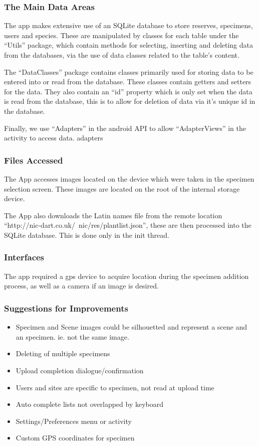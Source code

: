     \subsubsection{The Main Data Areas}
        The app makes extensive use of an SQLite database to store reserves, specimens, users and species. These are manipulated by classes for each table under the ``Utils'' package, which contain methods for selecting, inserting and deleting data from the databases, via the use of data classes related to the table's content.

        The ``DataClasses'' package contains classes primarily used for storing data to be entered into or read from the database. These classes contain getters and setters for the data. They also contain an ``id'' property which is only set when the data is read from the database, this is to allow for deletion of data via it's unique id in the database.

        Finally, we use ``Adapters'' in the android API to allow ``AdapterViews'' in the activity to access data.
        adapters

    \subsubsection{Files Accessed}
        The App accesses images located on the device which were taken in the specimen selection screen. These images are located on the root of the internal storage device.

        The App also downloads the Latin names file from the remote location ``http://nic-dart.co.uk/\texttildelow~nic/res/plantlist.json'', these are then processed into the SQLite database. This is done only in the init thread.

    \subsubsection{Interfaces}
        The app required a gps device to acquire location during the specimen addition process, as well as a camera if an image is desired.

    \subsubsection{Suggestions for Improvements}
        \begin{itemize}
            \item Specimen and Scene images could be silhouetted and represent a scene and an specimen. ie. not the same image.
            \item Deleting of multiple specimens
            \item Upload completion dialogue/confirmation
            \item Users and sites are specific to specimen, not read at upload time
            \item Auto complete lists not overlapped by keyboard
            \item Settings/Preferences menu or activity
            \item Custom GPS coordinates for specimen
        \end{itemize}

